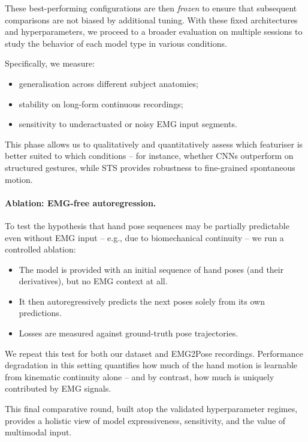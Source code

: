 These best-performing configurations are then \emph{frozen} to ensure that subsequent comparisons are not biased by additional tuning. With these fixed architectures and hyperparameters, we proceed to a broader evaluation on multiple sessions to study the behavior of each model type in various conditions.

Specifically, we measure:

\begin{itemize}
  \item generalisation across different subject anatomies;
  \item stability on long-form continuous recordings;
  \item sensitivity to underactuated or noisy EMG input segments.
\end{itemize}

This phase allows us to qualitatively and quantitatively assess which featuriser is better suited to which conditions -- for instance, whether CNNs outperform on structured gestures, while STS provides robustness to fine-grained spontaneous motion.

\paragraph{Ablation: EMG-free autoregression.}
To test the hypothesis that hand pose sequences may be partially predictable even without EMG input -- e.g., due to biomechanical continuity -- we run a controlled ablation:

\begin{itemize}
  \item The model is provided with an initial sequence of hand poses (and their
        derivatives), but no EMG context at all.
  \item It then autoregressively predicts the next poses solely from its own
        predictions.
  \item Losses are measured against ground-truth pose trajectories.
\end{itemize}

We repeat this test for both our dataset and EMG2Pose recordings.
Performance degradation in this setting quantifies how much of the hand motion is learnable from kinematic continuity alone -- and by contrast, how much is uniquely contributed by EMG signals.

This final comparative round, built atop the validated hyperparameter regimes, provides a holistic view of model expressiveness, sensitivity, and the value of multimodal input.
